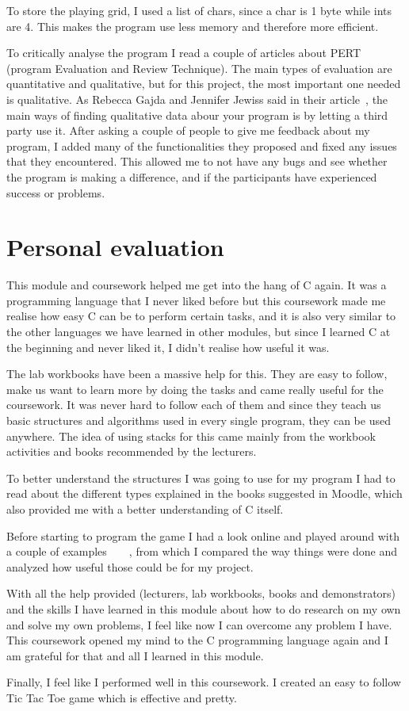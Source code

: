 \documentclass[10pt, a4paper]{article}
\begin{document}
To store the playing grid, I used a list of chars, since a char is 1 byte while ints are 4. This makes the program use less memory and therefore more efficient.

To critically analyse the program I read a couple of articles about PERT (program Evaluation and Review Technique). The main types of evaluation are quantitative and qualitative, but for this project, the most important one needed is qualitative. As Rebecca Gajda and Jennifer Jewiss said in their article~\cite{encyclopedia_of_evaluation}, the main ways of finding qualitative data abour your program is by letting a third party use it. After asking a couple of people to give me feedback about my program, I added many of the functionalities they proposed and fixed any issues that they encountered. This allowed me to not have any bugs and see whether the program is making a difference, and if the participants have experienced success or problems.

    \section{Personal evaluation}

This module and coursework helped me get into the hang of C again. It was a programming language that I never liked before but this coursework made me realise how easy C can be to perform certain tasks, and it is also very similar to the other languages we have learned in other modules, but since I learned C at the beginning and never liked it, I didn't realise how useful it was.

The lab workbooks have been a massive help for this. They are easy to follow, make us want to learn more by doing the tasks and came really useful for the coursework. It was never hard to follow each of them and since they teach us basic structures and algorithms used in every single program, they can be used anywhere. The idea of using stacks for this came mainly from the workbook activities and books recommended by the lecturers.

To better understand the structures I was going to use for my program I had to read about the different types explained in the books suggested in Moodle, which also provided me with a better understanding of C itself.

Before starting to program the game I had a look online and played around with a couple of examples~\cite{singh}~\cite{kripac}~\cite{geeksforgeeks_2018}~\cite{tictactoe_code}, from which I compared the way things were done and analyzed how useful those could be for my project.

With all the help provided (lecturers, lab workbooks, books and demonstrators) and the skills I have learned in this module about how to do research on my own and solve my own problems, I feel like now I can overcome any problem I have. This coursework opened my mind to the C programming language again and I am grateful for that and all I learned in this module.

Finally, I feel like I performed well in this coursework. I created an easy to follow Tic Tac Toe game which is effective and pretty.





\end{document}
